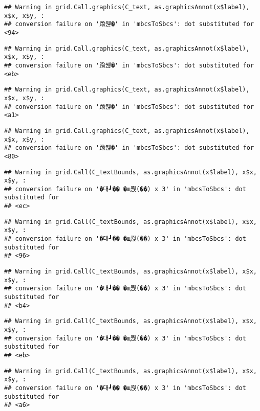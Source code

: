 \documentclass[
]{article}
\begin{document}
\begin{verbatim}
## Warning in grid.Call.graphics(C_text, as.graphicsAnnot(x$label), x$x, x$y, :
## conversion failure on '踰붾�' in 'mbcsToSbcs': dot substituted for <94>
\end{verbatim}

\begin{verbatim}
## Warning in grid.Call.graphics(C_text, as.graphicsAnnot(x$label), x$x, x$y, :
## conversion failure on '踰붾�' in 'mbcsToSbcs': dot substituted for <eb>
\end{verbatim}

\begin{verbatim}
## Warning in grid.Call.graphics(C_text, as.graphicsAnnot(x$label), x$x, x$y, :
## conversion failure on '踰붾�' in 'mbcsToSbcs': dot substituted for <a1>
\end{verbatim}

\begin{verbatim}
## Warning in grid.Call.graphics(C_text, as.graphicsAnnot(x$label), x$x, x$y, :
## conversion failure on '踰붾�' in 'mbcsToSbcs': dot substituted for <80>
\end{verbatim}

\begin{verbatim}
## Warning in grid.Call(C_textBounds, as.graphicsAnnot(x$label), x$x, x$y, :
## conversion failure on '�대┛�� �щ쭩(��) x 3' in 'mbcsToSbcs': dot substituted for
## <ec>
\end{verbatim}

\begin{verbatim}
## Warning in grid.Call(C_textBounds, as.graphicsAnnot(x$label), x$x, x$y, :
## conversion failure on '�대┛�� �щ쭩(��) x 3' in 'mbcsToSbcs': dot substituted for
## <96>
\end{verbatim}

\begin{verbatim}
## Warning in grid.Call(C_textBounds, as.graphicsAnnot(x$label), x$x, x$y, :
## conversion failure on '�대┛�� �щ쭩(��) x 3' in 'mbcsToSbcs': dot substituted for
## <b4>
\end{verbatim}

\begin{verbatim}
## Warning in grid.Call(C_textBounds, as.graphicsAnnot(x$label), x$x, x$y, :
## conversion failure on '�대┛�� �щ쭩(��) x 3' in 'mbcsToSbcs': dot substituted for
## <eb>
\end{verbatim}

\begin{verbatim}
## Warning in grid.Call(C_textBounds, as.graphicsAnnot(x$label), x$x, x$y, :
## conversion failure on '�대┛�� �щ쭩(��) x 3' in 'mbcsToSbcs': dot substituted for
## <a6>
\end{verbatim}
\end{document}
